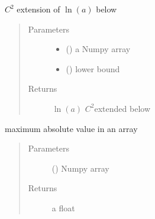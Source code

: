 \documentclass[letterpaper,10pt,english]{sphinxmanual}
\begin{document}
\begin{fulllineitems}
\label{\detokenize{ipfp_utils:ipfp_utils.nplog}}
\(C^2\) extension of  \(\ln(a)\) below 
\begin{quote}\begin{description}
\item[{Parameters}] \leavevmode\begin{itemize}
\item {} 
 () \textendash{} a Numpy array

\item {} 
 () \textendash{} lower bound

\end{itemize}

\item[{Returns}] \leavevmode
\(\ln(a)\) \(C^2\)\sphinxhyphen{}extended below 

\end{description}\end{quote}

\end{fulllineitems}


\begin{fulllineitems}
\label{\detokenize{ipfp_utils:ipfp_utils.npmaxabs}}
maximum absolute value in an array
\begin{quote}\begin{description}
\item[{Parameters}] \leavevmode
{} () \textendash{} Numpy array

\item[{Returns}] \leavevmode
a float

\end{description}\end{quote}

\end{fulllineitems}
\end{document}
